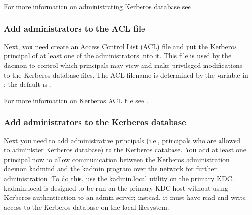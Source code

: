\documentclass[letterpaper,10pt,english]{sphinxmanual}
\begin{document}
\sphinxAtStartPar
For more information on administrating Kerberos database see
{\hyperref[\detokenize{admin/database:db-operations}]{}}.


\subsubsection{Add administrators to the ACL file}
\label{\detokenize{admin/install_kdc:add-administrators-to-the-acl-file}}\label{\detokenize{admin/install_kdc:admin-acl}}
\sphinxAtStartPar
Next, you need create an Access Control List (ACL) file and put the
Kerberos principal of at least one of the administrators into it.
This file is used by the {\hyperref[\detokenize{admin/admin_commands/kadmind:kadmind-8}]{}} daemon to control which
principals may view and make privileged modifications to the Kerberos
database files.  The ACL filename is determined by the 
variable in {\hyperref[\detokenize{admin/conf_files/kdc_conf:kdc-conf-5}]{}}; the default is {\hyperref[\detokenize{mitK5defaults:paths}]{}}.

\sphinxAtStartPar
For more information on Kerberos ACL file see {\hyperref[\detokenize{admin/conf_files/kadm5_acl:kadm5-acl-5}]{}}.


\subsubsection{Add administrators to the Kerberos database}
\label{\detokenize{admin/install_kdc:add-administrators-to-the-kerberos-database}}\label{\detokenize{admin/install_kdc:addadmin-kdb}}
\sphinxAtStartPar
Next you need to add administrative principals (i.e., principals who
are allowed to administer Kerberos database) to the Kerberos database.
You  add at least one principal now to allow communication
between the Kerberos administration daemon kadmind and the kadmin
program over the network for further administration.  To do this, use
the kadmin.local utility on the primary KDC.  kadmin.local is designed
to be run on the primary KDC host without using Kerberos
authentication to an admin server; instead, it must have read and
write access to the Kerberos database on the local filesystem.
\end{document}

